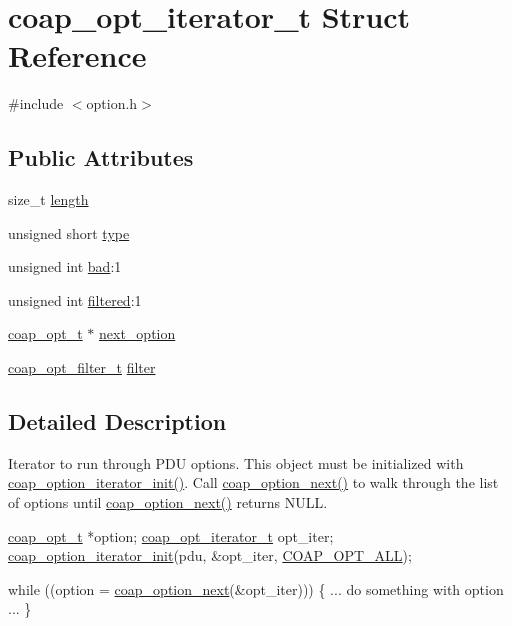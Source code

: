 \hypertarget{structcoap__opt__iterator__t}{}\section{coap\+\_\+opt\+\_\+iterator\+\_\+t Struct Reference}
\label{structcoap__opt__iterator__t}


{\ttfamily \#include $<$option.\+h$>$}

\subsection*{Public Attributes}
\begin{DoxyCompactItemize}
\item 
size\+\_\+t \hyperlink{structcoap__opt__iterator__t_a4f8dcbdb5373cb073b95f8c91a72cb0c}{length}
\item 
unsigned short \hyperlink{structcoap__opt__iterator__t_a57af4275c2fc6b9c2189b917469054f6}{type}
\item 
unsigned int \hyperlink{structcoap__opt__iterator__t_a48cbd8005c37ff481fe7d10cfc1f4bb6}{bad}\+:1
\item 
unsigned int \hyperlink{structcoap__opt__iterator__t_a6fed563dd49b61f28a275cd2f8c6f6a8}{filtered}\+:1
\item 
\hyperlink{option_8h_a351867e79474c96130f738fcfbc120cc}{coap\+\_\+opt\+\_\+t} $\ast$ \hyperlink{structcoap__opt__iterator__t_a05da7c127d28e7ba39d7186169596f6a}{next\+\_\+option}
\item 
\hyperlink{group__opt__filter_gace614f18a4f0133a72096094c11c3b19}{coap\+\_\+opt\+\_\+filter\+\_\+t} \hyperlink{structcoap__opt__iterator__t_a40a864c48b367abcaed1afa30621f405}{filter}
\end{DoxyCompactItemize}


\subsection{Detailed Description}
Iterator to run through P\+D\+U options. This object must be initialized with \hyperlink{group__opt__filter_gacec8f143e7a4fe66d97f719f619d42b3}{coap\+\_\+option\+\_\+iterator\+\_\+init()}. Call \hyperlink{group__opt__filter_ga182fdeffe0b37e1ab0dc6ba8494abe4a}{coap\+\_\+option\+\_\+next()} to walk through the list of options until \hyperlink{group__opt__filter_ga182fdeffe0b37e1ab0dc6ba8494abe4a}{coap\+\_\+option\+\_\+next()} returns {\ttfamily N\+U\+L\+L}.


\begin{DoxyCode}
\hyperlink{option_8h_a351867e79474c96130f738fcfbc120cc}{coap\_opt\_t} *option;
\hyperlink{structcoap__opt__iterator__t}{coap\_opt\_iterator\_t} opt\_iter;
\hyperlink{group__opt__filter_gacec8f143e7a4fe66d97f719f619d42b3}{coap\_option\_iterator\_init}(pdu, &opt\_iter, \hyperlink{group__opt__filter_ga81f470e9cdcc258799e10f6ed8a3ce5e}{COAP\_OPT\_ALL});

\textcolor{keywordflow}{while} ((option = \hyperlink{group__opt__filter_ga182fdeffe0b37e1ab0dc6ba8494abe4a}{coap\_option\_next}(&opt\_iter))) \{
  ... \textcolor{keywordflow}{do} something with option ...
\}
\end{DoxyCode}
 

